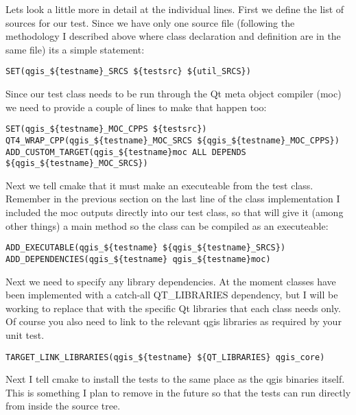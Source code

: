 Lets look a little more in detail at the individual lines. First we define the
list of sources for our test. Since we have only one source file (following the
methodology I described above where class declaration and definition are in the
same file) its a simple statement:

\begin{verbatim}
SET(qgis_${testname}_SRCS ${testsrc} ${util_SRCS})
\end{verbatim}

Since our test class needs to be run through the Qt meta object compiler (moc)
we need to provide a couple of lines to make that happen too:

\begin{verbatim}
SET(qgis_${testname}_MOC_CPPS ${testsrc})
QT4_WRAP_CPP(qgis_${testname}_MOC_SRCS ${qgis_${testname}_MOC_CPPS})
ADD_CUSTOM_TARGET(qgis_${testname}moc ALL DEPENDS ${qgis_${testname}_MOC_SRCS})
\end{verbatim}

Next we tell cmake that it must make an executeable from the test class.
Remember in the previous section on the last line of the class implementation I
included the moc outputs directly into our test class, so that will give it
(among other things) a main method so the class can be compiled as an
executeable:

\begin{verbatim}
ADD_EXECUTABLE(qgis_${testname} ${qgis_${testname}_SRCS})
ADD_DEPENDENCIES(qgis_${testname} qgis_${testname}moc)
\end{verbatim}

Next we need to specify any library dependencies. At the moment classes have
been implemented with a catch-all QT\_LIBRARIES dependency, but I will be
working to replace that with the specific Qt libraries that each class needs
only. Of course you also need to link to the relevant qgis libraries as
required by your unit test.

\begin{verbatim}
TARGET_LINK_LIBRARIES(qgis_${testname} ${QT_LIBRARIES} qgis_core)
\end{verbatim}

Next I tell cmake to install the tests to the same place as the qgis binaries
itself. This is something I plan to remove in the future so that the tests can
run directly from inside the source tree.


